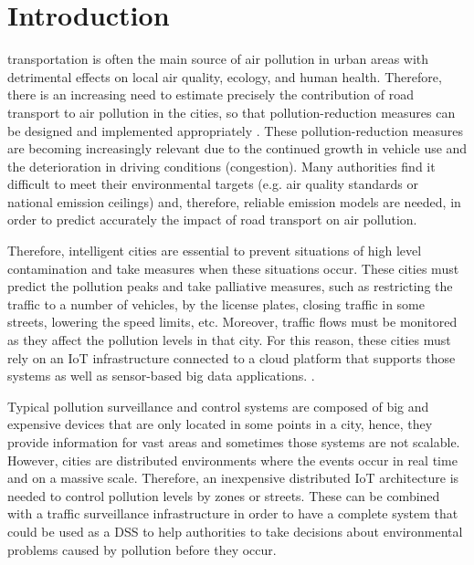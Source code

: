 
\chapter{Introduction} %
 transportation is often the main source of air pollution in urban areas with detrimental effects on local air quality, ecology, and human health. Therefore, there is an increasing need to estimate precisely the contribution of road transport to air pollution in the cities, so that pollution-reduction measures can be designed and implemented appropriately \cite{SNB10}. These pollution-reduction measures are becoming increasingly relevant due to the continued growth in vehicle use and the deterioration in driving conditions (congestion). Many authorities find it difficult to meet their environmental targets (e.g. air quality standards or national emission ceilings) and, therefore, reliable emission models are needed, in order to predict accurately the impact of road transport on air pollution.

Therefore, intelligent cities are essential to prevent situations of high level contamination and take measures when these situations occur. These cities must predict the pollution peaks and take palliative measures, such as restricting the traffic to a number of vehicles, by the license plates, closing traffic in some streets, lowering the speed limits, etc. Moreover, traffic flows must be monitored as they affect the pollution levels in that city. For this reason, these cities must rely on an \ac{IoT} infrastructure connected to a cloud platform that supports those systems as well as sensor-based big data applications. \cite{Bib18}.

Typical pollution surveillance and control systems are composed of big and expensive devices that are only located in some points in a city, hence, they provide information for vast areas and sometimes those systems are not scalable. However, cities are distributed environments where the events occur in real time and on a massive scale. Therefore, an inexpensive distributed IoT architecture is needed to control pollution levels by zones or streets. These can be combined with a traffic surveillance infrastructure in order to have a complete system that could be used as a \ac{DSS} to help authorities to take decisions about environmental problems caused by pollution before they occur.

